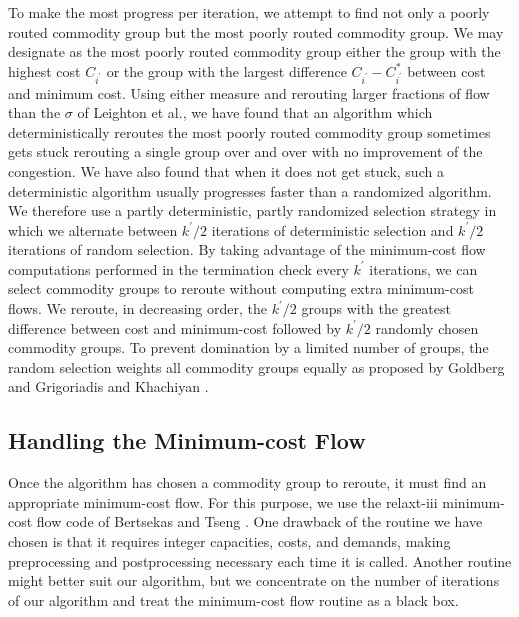To make the most progress per iteration, we attempt to find not only a
poorly routed commodity group but the most poorly routed commodity group.
We may designate as the most poorly routed commodity group 
either the group with the highest cost $C_{i^\prime}$
or the group with the largest difference $C_{i^\prime} - C_{i^\prime}^*$
between cost and minimum cost.  
Using either measure and rerouting larger fractions of flow than the
$\sigma$ of Leighton et al., 
we have found that an algorithm which deterministically reroutes
the most poorly routed commodity group sometimes gets stuck
rerouting a single group over and over with no improvement of the congestion.
We have also found that when it does not get stuck,
such a deterministic algorithm usually progresses faster than
a randomized algorithm. 
We therefore use a partly deterministic, partly randomized selection strategy
in which we alternate between $k^\prime / 2$ iterations of deterministic
selection and $k^\prime / 2$ iterations of random selection.
By taking advantage of the minimum-cost flow computations performed
in the termination check every $k^\prime$ iterations,
we can select commodity groups to reroute without computing extra 
minimum-cost flows.
We reroute, in decreasing order, the $k^\prime / 2$ groups with the
greatest difference between cost and minimum-cost followed by
$k^\prime / 2$ randomly chosen commodity groups.
To prevent domination by a limited number of groups,
the random selection weights all commodity groups equally
as proposed by Goldberg \cite{Goldberg91} and Grigoriadis and Khachiyan
\cite{GrigoriadisK91}. 

\subsection{Handling the Minimum-cost Flow}
Once the algorithm has chosen a commodity group to reroute,
it must find an appropriate minimum-cost flow.
For this purpose, we use the {\sc relaxt-iii} minimum-cost flow code 
of Bertsekas and Tseng \cite{BertsekasT90}.
One drawback of the routine we have chosen is that it requires integer 
capacities, costs, and demands, making preprocessing and postprocessing 
necessary each time it is called.
Another routine might better suit our algorithm,
but we concentrate on the number of iterations of our algorithm
and treat the minimum-cost flow routine as a black box.

